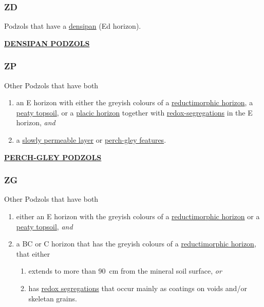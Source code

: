 \documentclass[
  letterpaper,
  DIV=11,
  numbers=noendperiod]{scrreprt}
\providecommand{\tightlist}{%
  \setlength{\itemsep}{0pt}\setlength{\parskip}{0pt}}\usepackage{longtable,booktabs,array}
\begin{document}
\hypertarget{sec-key-ZD}{%
\subsubsection{\texorpdfstring{\textbf{ZD}}{ZD}}\label{sec-key-ZD}}

Podzols that have a \protect\hyperlink{sec-diag-dens}{densipan} (Ed
horizon).

\protect\hyperlink{sec-ZD}{\textbf{DENSIPAN PODZOLS}}

\hypertarget{sec-key-ZP}{%
\subsubsection{\texorpdfstring{\textbf{ZP}}{ZP}}\label{sec-key-ZP}}

Other Podzols that have both

\begin{enumerate}
\def\labelenumi{\arabic{enumi}.}
\tightlist
\item
  an E horizon with either the greyish colours of a
  \protect\hyperlink{sec-diag-redmh}{reductimorphic horizon}, a
  \protect\hyperlink{sec-diag-pts}{peaty topsoil}, or a
  \protect\hyperlink{diag-plac}{placic horizon} together with
  \protect\hyperlink{sec-diag-rsegs}{redox-segregations} in the E
  horizon, \emph{and}
\item
  a \protect\hyperlink{sec-diag-slowp}{slowly permeable layer} or
  \protect\hyperlink{sec-diag-pgley}{perch-gley features}.
\end{enumerate}

\protect\hyperlink{sec-ZP}{\textbf{PERCH-GLEY PODZOLS}}

\hypertarget{sec-key-ZG}{%
\subsubsection{\texorpdfstring{\textbf{ZG}}{ZG}}\label{sec-key-ZG}}

Other Podzols that have both

\begin{enumerate}
\def\labelenumi{\arabic{enumi}.}
\tightlist
\item
  either an E horizon with the greyish colours of a
  \protect\hyperlink{sec-diag-redmh}{reductimorphic horizon} or a
  \protect\hyperlink{sec-diag-pts}{peaty topsoil}, \emph{and}
\item
  a BC or C horizon that has the greyish colours of a
  \protect\hyperlink{sec-diag-redmh}{reductimorphic horizon}, that
  either

  \begin{enumerate}
  \def\labelenumii{(\alph{enumii})}
  \tightlist
  \item
    extends to more than 90~cm from the mineral soil surface, \emph{or}
  \item
    has \protect\hyperlink{sec-diag-rsegs}{redox segregations} that
    occur mainly as coatings on voids and/or skeletan grains.
  \end{enumerate}
\end{enumerate}
\end{document}
